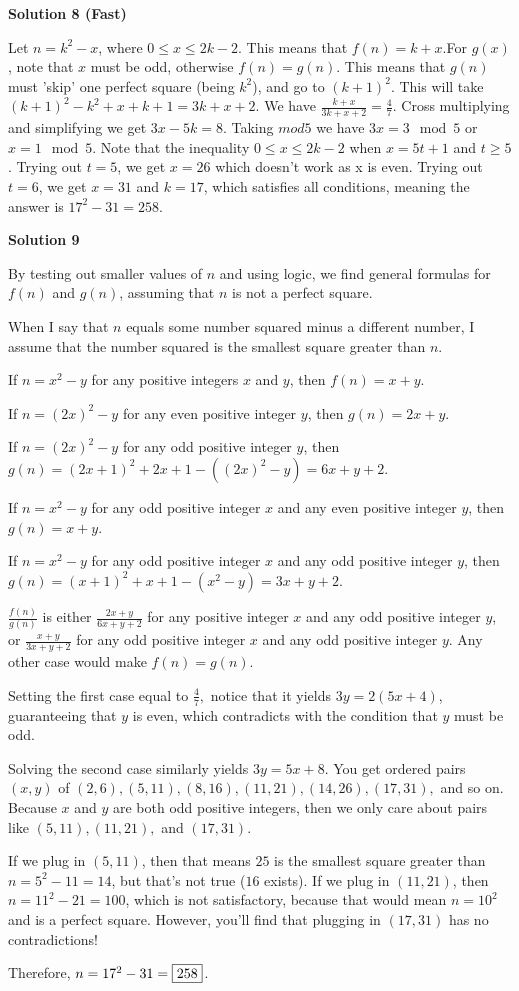 \begin{enumerate}
\textbf{Solution 8 (Fast)}

Let $n=k^2-x$, where $0 \leq x \leq 2k-2$. This means that $f(n)=k+x$.For $g(x)$, note that $x$ must be odd, otherwise $f(n)=g(n)$. This means that $g(n)$ must 'skip' one perfect square (being $k^2$), and go to $(k+1)^2$. This will take $(k+1)^2-k^2+x+k+1=3k+x+2$. We have $\frac{k+x}{3k+x+2}=\frac{4}{7}$. Cross multiplying and simplifying we get $3x-5k=8$. Taking $mod 5$ we have $3x=3 \mod 5$ or $x = 1 \mod 5$. Note that the inequality $0 \leq x \leq 2k-2$ when $x=5t+1$ and $t \geq 5$. Trying out $t=5$, we get $x=26$ which doesn't work as x is even. Trying out $t=6$, we get $x=31$ and $k=17$, which satisfies all conditions, meaning the answer is $17^2-31=\boxed{258}.$




\textbf{Solution 9}

By testing out smaller values of $n$ and using logic, we find general formulas for $f(n)$ and $g(n)$, assuming that $n$ is not a perfect square.

 When I say that $n$ equals some number squared minus a different number, I assume that the number squared is the smallest square greater than $n$.

 If $n=x^2-y$ for any positive integers $x$ and $y$, then $f(n)=x+y$.

 If $n=(2x)^2-y$ for any even positive integer $y$, then $g(n)=2x+y$.

 If $n=(2x)^2-y$ for any odd positive integer $y$, then $g(n)=(2x+1)^2+2x+1-((2x)^2-y)=6x+y+2$.

 If $n=x^2-y$ for any odd positive integer $x$ and any even positive integer $y$, then $g(n)=x+y$.

 If $n=x^2-y$ for any odd positive integer $x$ and any odd positive integer $y$, then $g(n)=(x+1)^2+x+1-(x^2-y)=3x+y+2$.

 $\frac{f(n)}{g(n)}$ is either $\frac{2x+y}{6x+y+2}$ for any positive integer $x$ and any odd positive integer $y$, or $\frac{x+y}{3x+y+2}$ for any odd positive integer $x$ and any odd positive integer $y$. Any other case would make $f(n)=g(n)$.

 Setting the first case equal to $\frac{4}{7},$ notice that it yields $3y=2(5x+4)$, guaranteeing that $y$ is even, which contradicts with the condition that $y$ must be odd.

 Solving the second case similarly yields $3y=5x+8$. You get ordered pairs $(x, y)$ of $(2, 6), (5, 11), (8, 16), (11, 21), (14, 26), (17, 31),$ and so on. Because $x$ and $y$ are both odd positive integers, then we only care about pairs like $(5, 11), (11, 21),$ and $(17, 31)$.

 If we plug in $(5, 11)$, then that means $25$ is the smallest square greater than $n=5^2-11=14$, but that's not true ($16$ exists). If we plug in $(11, 21)$, then $n=11^2-21=100$, which is not satisfactory, because that would mean $n=10^2$ and is a perfect square. However, you'll find that plugging in $(17, 31)$ has no contradictions!

 Therefore, $n=17^2-31=\framebox{258}$.

 


\end{enumerate}